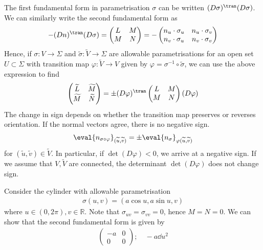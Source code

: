 \begin{remark}
	The first fundamental form in parametrisation $\sigma$ can be written $(D \sigma)^\tran (D \sigma)$.
	We can similarly write the second fundamental form as
	\begin{align*}
		-(Dn)^\tran (D\sigma) = \begin{pmatrix}
			L & M \\
			M & N
		\end{pmatrix} = -\begin{pmatrix}
			n_u \cdot \sigma_u & n_u \cdot \sigma_v \\
			n_v \cdot \sigma_u & n_v \cdot \sigma_v
		\end{pmatrix}
	\end{align*}
	Hence, if $\sigma \colon V \to \Sigma$ and $\widetilde \sigma \colon \widetilde V \to \Sigma$ are allowable parametrisations for an open set $U \subset \Sigma$ with transition map $\varphi \colon \widetilde V \to V$ given by $\varphi = \sigma^{-1} \circ \widetilde \sigma$, we can use the above expression to find
	\begin{align*}
		\begin{pmatrix}
			\widetilde L & \widetilde M \\
			\widetilde M & \widetilde N
		\end{pmatrix} = \pm (D\varphi)^\tran \begin{pmatrix}
			L & M \\
			M & N
		\end{pmatrix} (D\varphi)
	\end{align*}
	The change in sign depends on whether the transition map preserves or reverses orientation.
	If the normal vectors agree, there is no negative sign.
	\begin{align*}
		\eval{n_{\sigma \circ \varphi}}_{(\widetilde u, \widetilde v)} = \pm \eval{n_\sigma}_{\varphi(\widetilde u, \widetilde v)}
	\end{align*}
	for $(\widetilde u, \widetilde v) \in \widetilde V$.
	In particular, if $\det (D \varphi) < 0$, we arrive at a negative sign.
	If we assume that $V, \widetilde V$ are connected, the determinant $\det (D \varphi)$ does not change sign.
\end{remark}
\begin{example}
	Consider the cylinder with allowable parametrisation
	\begin{align*}
		\sigma(u,v) = (a \cos u, a \sin u, v)
	\end{align*}
	where $u \in (0,2\pi), v \in \mathbb R$.
	Note that $\sigma_{uv} = \sigma_{vv} = 0$, hence $M = N = 0$.
	We can show that the second fundamental form is given by
	\begin{align*}
		\begin{pmatrix}
			-a & 0 \\
			0  & 0
		\end{pmatrix};\quad -a \dd{u}^2
	\end{align*}
\end{example}

